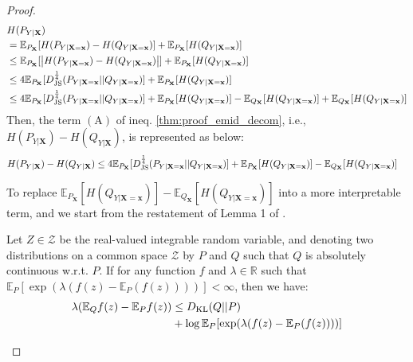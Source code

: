 \begin{proof}
\begin{align*}
&H(P_{Y|\mathbf{X}}) \\
&= \mathbb{E}_{P_{\mathbf{X}}}[H(P_{Y|\mathbf{X}=\mathbf{x}}) - H(Q_{Y|\mathbf{X}=\mathbf{x}})] + \mathbb{E}_{P_{\mathbf{X}}}[H(Q_{Y|\mathbf{X}=\mathbf{x}})] \\
&\leq \mathbb{E}_{P_{\mathbf{X}}}[ \big| H(P_{Y|\mathbf{X}=\mathbf{x}}) - H(Q_{Y|\mathbf{X}=\mathbf{x}}) \big| ] + \mathbb{E}_{P_{\mathbf{X}}}[H(Q_{Y|\mathbf{X}=\mathbf{x}})] \\
&\leq 4\mathbb{E}_{P_{\mathbf{X}}}[D^{\frac{1}{4}}_{\rm JS}(P_{Y|\mathbf{X}=\mathbf{x}} || Q_{Y|\mathbf{X}=\mathbf{x}})] + \mathbb{E}_{P_{\mathbf{X}}}[H(Q_{Y|\mathbf{X}=\mathbf{x}})] \\
&\leq 4\mathbb{E}_{P_{\mathbf{X}}}[D^{\frac{1}{4}}_{\rm JS}(P_{Y|\mathbf{X}=\mathbf{x}} || Q_{Y|\mathbf{X}=\mathbf{x}})] + \mathbb{E}_{P_{\mathbf{X}}}[H(Q_{Y|\mathbf{X}=\mathbf{x}})] - \mathbb{E}_{Q_{\mathbf{X}}}[H(Q_{Y|\mathbf{X}=\mathbf{x}})] + \mathbb{E}_{Q_{\mathbf{X}}}[H(Q_{Y|\mathbf{X}=\mathbf{x}})] \\
\end{align*}
Then, the term $(\text{A})$ of ineq. \eqref{thm:proof_emid_decom}, i.e., $H(P_{Y|\mathbf{X}}) - H(Q_{Y|\mathbf{X}})$, is represented as below:
\begin{align*}
&H(P_{Y|\mathbf{X}}) - H(Q_{Y|\mathbf{X}}) \leq 4\mathbb{E}_{P_{\mathbf{X}}}[D^{\frac{1}{4}}_{\rm JS}(P_{Y|\mathbf{X}=\mathbf{x}} || Q_{Y|\mathbf{X}=\mathbf{x}})] + \mathbb{E}_{P_{\mathbf{X}}}[H(Q_{Y|\mathbf{X}=\mathbf{x}})] - \mathbb{E}_{Q_{\mathbf{X}}}[H(Q_{Y|\mathbf{X}=\mathbf{x}})]
\end{align*}

To replace $\mathbb{E}_{P_{\mathbf{X}}}[H(Q_{Y|\mathbf{X}=\mathbf{x}})] - \mathbb{E}_{Q_{\mathbf{X}}}[H(Q_{Y|\mathbf{X}=\mathbf{x}})]$ into a more interpretable term, and we start from the restatement of Lemma 1 of \citet{shui2022novel}.

\begin{lemma} \label{thm:lemma_shui}
Let $Z \in \mathcal{Z}$ be the real-valued integrable random variable, and denoting two distributions on a common space $\mathcal{Z}$ by $P$ and $Q$ such that $Q$ is absolutely continuous w.r.t. $P$. If for any function $f$ and $\lambda\in\mathbb{R}$ such that $\mathbb{E}_{P}[\exp(\lambda(f(z)-\mathbb{E}_{P}(f(z))))] < \infty$, then we have:
\begin{equation}
\begin{split}
\lambda (\mathbb{E}_{Q}f(z) - \mathbb{E}_{P}f(z)) &\leq D_{\rm KL}(Q || P) \\ &+ \log \mathbb{E}_{P}[\exp(\lambda (f(z)-\mathbb{E}_{P}(f(z))))] \nonumber
\end{split}
\end{equation}
\end{lemma} 


\end{proof}
